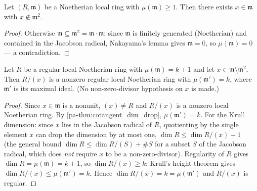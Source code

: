 \begin{lemma}
  \label{pa-lem:notMemSq_witness}
  \leanok

  Let \((R, \mathfrak m)\) be a Noetherian local ring with \(\mu(\mathfrak m) \geq 1\).
  Then there exists \(x \in \mathfrak m\) with \(x \notin \mathfrak m^2\).
\end{lemma}
\begin{proof}
  \leanok
  Otherwise \(\mathfrak m \subseteq \mathfrak m^2 = \mathfrak m \cdot \mathfrak m\);
  since \(\mathfrak m\) is finitely generated (Noetherian) and contained in the
  Jacobson radical, Nakayama's lemma gives \(\mathfrak m = 0\), so
  \(\mu(\mathfrak m) = 0\) --- a contradiction.
\end{proof}

\begin{lemma}
  \label{pa-lem:regular_quotient}
  \leanok

  Let \(R\) be a regular local Noetherian ring with \(\mu(\mathfrak m) = k + 1\) and let
  \(x \in \mathfrak m \setminus \mathfrak m^2\). Then \(R/(x)\) is a nonzero regular
  local Noetherian ring with \(\mu(\mathfrak m') = k\), where \(\mathfrak m'\) is its
  maximal ideal. (No non-zero-divisor hypothesis on \(x\) is made.)
\end{lemma}
\begin{proof}
  \leanok
  Since \(x \in \mathfrak m\) is a nonunit, \((x) \neq R\) and \(R/(x)\) is a nonzero
  local Noetherian ring. By \ref{pa-thm:cotangent_dim_drop},
  \(\mu(\mathfrak m') = k\). For the Krull dimension: since \(x\) lies in the Jacobson
  radical of \(R\), quotienting by the single element \(x\) can drop the dimension by at
  most one, \(\dim R \leq \dim R/(x) + 1\) (the general bound
  \(\dim R \leq \dim R/(S) + \#S\) for a subset \(S\) of the Jacobson radical, which
  does \emph{not} require \(x\) to be a non-zero-divisor). Regularity of \(R\) gives
  \(\dim R = \mu(\mathfrak m) = k + 1\), so \(\dim R/(x) \geq k\); Krull's height
  theorem gives \(\dim R/(x) \leq \mu(\mathfrak m') = k\). Hence
  \(\dim R/(x) = k = \mu(\mathfrak m')\) and \(R/(x)\) is regular.
\end{proof}

